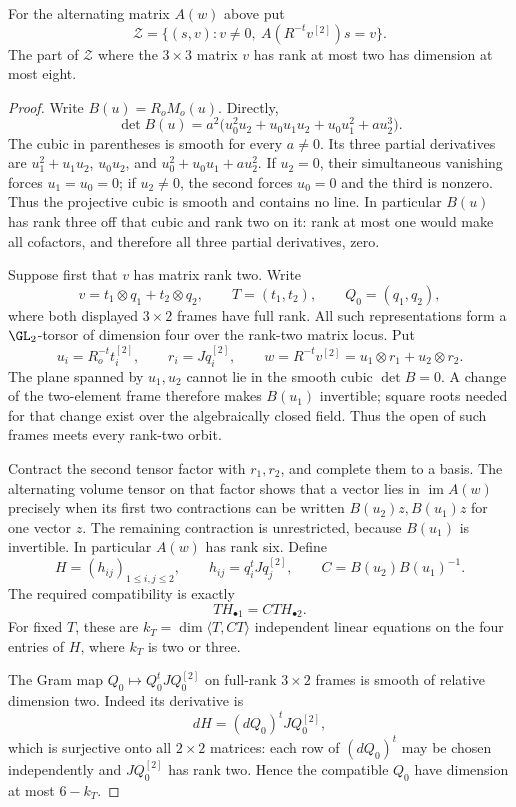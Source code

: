 \begin{lemma}
\label{lem:mixed-degree-one-exceptional-ranks-candidate}
For the alternating matrix $A(w)$ above put
\[
       \mathcal Z=\{(s,v):v\ne0,\ A(R^{-t}v^{[2]})s=v\}.
\]
The part of $\mathcal Z$ where the $3\times3$ matrix $v$ has
rank at most two has dimension at most eight.
\end{lemma}
\begin{proof}
Write $B(u)=R_oM_o(u)$. Directly,
\[
 \det B(u)=a^2\bigl(u_0^2u_2+u_0u_1u_2+u_0u_1^2+a u_2^3\bigr).
\]
The cubic in parentheses is smooth for every $a\ne0$.
Its three partial derivatives are
$u_1^2+u_1u_2$, $u_0u_2$, and
$u_0^2+u_0u_1+a u_2^2$.
If $u_2=0$, their simultaneous vanishing forces $u_1=u_0=0$;
if $u_2\ne0$, the second forces $u_0=0$ and the third is
nonzero. Thus the projective cubic is smooth and contains no
line. In particular $B(u)$ has rank three off that cubic
and rank two on it: rank at most one would make all cofactors,
and therefore all three partial derivatives, zero.

Suppose first that $v$ has matrix rank two. Write
\[
 v=t_1\otimes q_1+t_2\otimes q_2,
 \qquad T=(t_1,t_2),\qquad Q_0=(q_1,q_2),
\]
where both displayed $3\times2$ frames have full rank.
All such representations form a $\GL_2$-torsor of dimension
four over the rank-two matrix locus. Put
\[
 u_i=R_o^{-t}t_i^{[2]},\qquad r_i=Jq_i^{[2]},\qquad
 w=R^{-t}v^{[2]}=u_1\otimes r_1+u_2\otimes r_2.
\]
The plane spanned by $u_1,u_2$ cannot lie in the smooth cubic
$\det B=0$. A change of the two-element frame therefore makes
$B(u_1)$ invertible; square roots needed for that change exist
over the algebraically closed field. Thus the open of such
frames meets every rank-two orbit.

Contract the second tensor factor with $r_1,r_2$, and complete
them to a basis. The alternating volume tensor on that factor
shows that a vector lies in $\operatorname{im}A(w)$ precisely
when its first two contractions can be written
$B(u_2)z,B(u_1)z$ for one vector $z$. The remaining contraction
is unrestricted, because $B(u_1)$ is invertible. In particular
$A(w)$ has rank six. Define
\[
 H=(h_{ij})_{1\le i,j\le2},\qquad
 h_{ij}=q_i^tJq_j^{[2]},\qquad C=B(u_2)B(u_1)^{-1}.
\]
The required compatibility is exactly
\[
                         T H_{\bullet1}=CT H_{\bullet2}.
\]
For fixed $T$, these are $k_T=\dim\langle T,CT\rangle$
independent linear equations on the four entries of $H$,
where $k_T$ is two or three.

The Gram map $Q_0\mapsto Q_0^tJQ_0^{[2]}$ on full-rank
$3\times2$ frames is smooth of relative dimension two.
Indeed its derivative is
\[
                     dH=(dQ_0)^tJQ_0^{[2]},
\]
which is surjective onto all $2\times2$ matrices: each row
of $(dQ_0)^t$ may be chosen independently and
$JQ_0^{[2]}$ has rank two. Hence the compatible $Q_0$ have
dimension at most $6-k_T$.


\end{proof}
